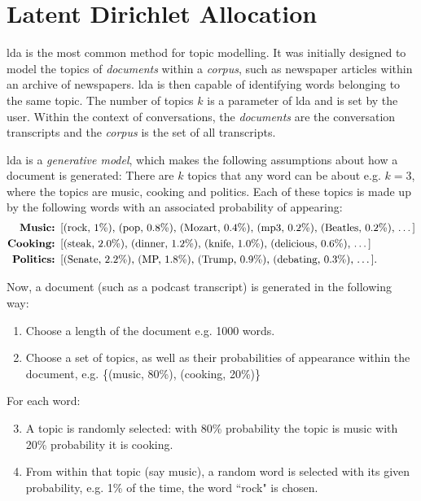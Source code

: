 \section{Latent Dirichlet Allocation \label{ssec: LDA}}
    \Gls{lda}\cite{blei2003latent} is the most common method for topic modelling. It was initially designed to model the topics of \textit{documents} within a \textit{corpus}, such as newspaper articles within an archive of newspapers. \gls{lda} is then capable of identifying words belonging to the same topic. The number of topics $k$ is a parameter of \gls{lda} and is set by the user.
    Within the context of conversations, the \textit{documents} are the conversation transcripts and the \textit{corpus} is the set of all transcripts.

    \gls{lda} is a \textit{generative model}, which makes the following assumptions about how a document is generated: There are $k$ topics that any word can be about e.g. $k=3$, where the topics are music, cooking and politics. Each of these topics is made up by the following words with an associated probability of appearing:
    \begin{align*}
        \textbf{Music:  }& \text{[(rock, 1\%), (pop, 0.8\%), (Mozart, 0.4\%), (mp3, 0.2\%), (Beatles, 0.2\%), \dots]}\\
        \textbf{Cooking:    }& \text{[(steak, 2.0\%), (dinner, 1.2\%), (knife, 1.0\%), (delicious, 0.6\%), \dots]}\\
        \textbf{Politics:   }& \text{[(Senate, 2.2\%), (MP, 1.8\%), (Trump, 0.9\%), (debating, 0.3\%), \dots]}.
    \end{align*}

    Now, a document (such as a podcast transcript) is generated in the following way:

    \begin{enumerate}
        \item Choose a length of the document e.g. 1000 words.
        \item Choose a set of topics, as well as their probabilities of appearance within the document, e.g. \{(music, 80\%), (cooking, 20\%)\}
    \end{enumerate}

    For each word:
    \begin{enumerate}[leftmargin=6em]
    \setcounter{enumi}{2}
        \item A topic is randomly selected: with 80\% probability the topic is music with 20\% probability it is cooking.
        \item From within that topic (say music), a random word is selected with its given probability, e.g. 1\% of the time, the word ``rock" is chosen.
    \end{enumerate}

